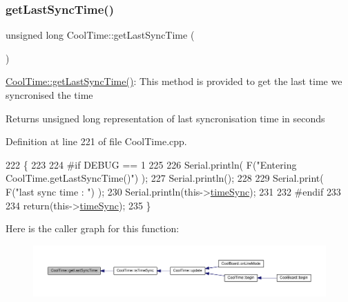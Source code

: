 \mbox{\label{class_cool_time_a5d17f707a9d337720493b2bce9d41c21}} 
\subsubsection{\texorpdfstring{get\+Last\+Sync\+Time()}{getLastSyncTime()}}
{\footnotesize\ttfamily unsigned long Cool\+Time\+::get\+Last\+Sync\+Time (\begin{DoxyParamCaption}{ }\end{DoxyParamCaption})}

\hyperlink{class_cool_time_a5d17f707a9d337720493b2bce9d41c21}{Cool\+Time\+::get\+Last\+Sync\+Time()}\+: This method is provided to get the last time we syncronised the time

\begin{DoxyReturn}{Returns}
unsigned long representation of last syncronisation time in seconds 
\end{DoxyReturn}


Definition at line 221 of file Cool\+Time.\+cpp.


\begin{DoxyCode}
222 \{
223 
224 \textcolor{preprocessor}{#if DEBUG == 1 }
225 
226     Serial.println( F(\textcolor{stringliteral}{"Entering CoolTime.getLastSyncTime()"}) );
227     Serial.println();
228     
229     Serial.print( F(\textcolor{stringliteral}{"last sync time : "}) );
230     Serial.println(this->\hyperlink{class_cool_time_a9d032e76c3470a15b3bbbc52af6463f7}{timeSync});
231 
232 \textcolor{preprocessor}{#endif }
233 
234     \textcolor{keywordflow}{return}(this->\hyperlink{class_cool_time_a9d032e76c3470a15b3bbbc52af6463f7}{timeSync});
235 \}
\end{DoxyCode}
Here is the caller graph for this function\+:\nopagebreak
\begin{figure}[H]
\begin{center}
\leavevmode
\includegraphics[width=350pt]{d6/d49/class_cool_time_a5d17f707a9d337720493b2bce9d41c21_icgraph}
\end{center}
\end{figure}
\mbox{\label{class_cool_time_a41fbbbfd651c2079f54d4b2911e4c705}} 
